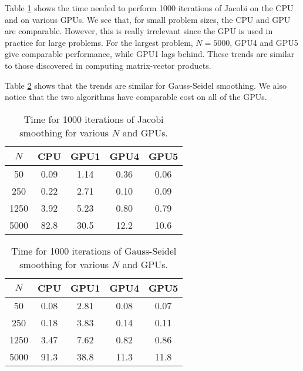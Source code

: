 \documentclass[a4paper]{article}
\begin{document}
Table \ref{tab:jactime} shows the time needed to perform 1000 iterations of Jacobi on the CPU and on various GPUs. We see that, for small problem sizes, the CPU and GPU are comparable. However, this is really irrelevant since the GPU is used in practice for large problems. For the largest problem, $N=5000$, GPU4 and GPU5 give comparable performance, while GPU1 lags behind. These trends are similar to those discovered in computing matrix-vector products. 

Table \ref{tab:gstime} shows that the trends are similar for Gauss-Seidel smoothing. We also notice that the two algorithms have comparable cost on all of the GPUs. 

\begin{table}[ht]
\centering
\begin{tabular}{c|c|c|c|c}
$N$ & CPU & GPU1 & GPU4 & GPU5\\[2 pt] \hline
50 & 0.09 & 1.14 & 0.36 & 0.06 \\[2 pt]
250 & 0.22 & 2.71 & 0.10 & 0.09 \\[2 pt]
1250 & 3.92 & 5.23 & 0.80 &0.79 \\[2 pt]
5000 & 82.8 & 30.5 & 12.2 & 10.6
\end{tabular}
\caption{Time for 1000 iterations of Jacobi smoothing for various $N$ and GPUs. }
\label{tab:jactime}
\end{table}

\begin{table}[ht]
\centering
\begin{tabular}{c|c|c|c|c}
$N$ & CPU & GPU1 & GPU4 & GPU5\\[2 pt] \hline
50 & 0.08 & 2.81 & 0.08 & 0.07 \\[2 pt]
250 & 0.18 & 3.83 & 0.14 & 0.11 \\[2 pt]
1250 & 3.47 & 7.62 & 0.82 & 0.86 \\[2 pt]
5000 & 91.3 & 38.8 & 11.3 & 11.8
\end{tabular}
\caption{Time for 1000 iterations of Gauss-Seidel smoothing for various $N$ and GPUs. }
\label{tab:gstime}
\end{table}
\end{document}
